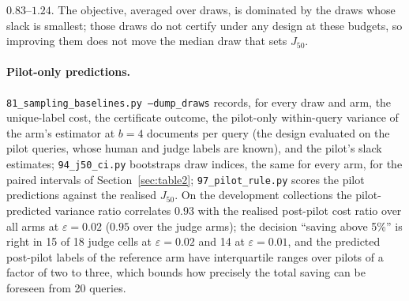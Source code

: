 \documentclass{article}
\newcommand{\eps}{\varepsilon}
\newcommand{\Jfifty}{J_{50}}
\begin{document}
$0.83$--$1.24$. The objective, averaged over draws, is dominated by the draws whose slack is smallest; those draws do not certify under any design at these budgets, so improving them does not move the median draw that sets $\Jfifty$.

\paragraph{Pilot-only predictions.} \texttt{81\_sampling\_baselines.py --dump\_draws} records, for every draw and arm, the unique-label cost, the certificate outcome, the pilot-only within-query variance of the arm's estimator at $b=4$ documents per query (the design evaluated on the pilot queries, whose human and judge labels are known), and the pilot's slack estimates; \texttt{94\_j50\_ci.py} bootstraps draw indices, the same for every arm, for the paired intervals of Section~\ref{sec:table2}; \texttt{97\_pilot\_rule.py} scores the pilot predictions against the realised $\Jfifty$. On the development collections the pilot-predicted variance ratio correlates $0.93$ with the realised post-pilot cost ratio over all arms at $\eps=0.02$ ($0.95$ over the judge arms); the decision ``saving above 5\%'' is right in 15 of 18 judge cells at $\eps=0.02$ and 14 at $\eps=0.01$, and the predicted post-pilot labels of the reference arm have interquartile ranges over pilots of a factor of two to three, which bounds how precisely the total saving can be foreseen from 20 queries.
\end{document}
